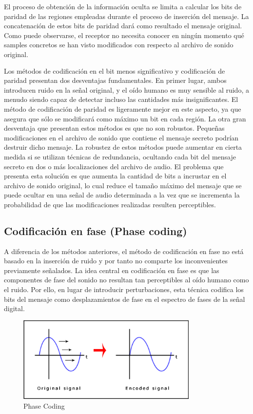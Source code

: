 \documentclass[12pt]{article}
\begin{document}
El proceso de obtención de la información oculta se limita a calcular los bits de paridad de las regiones empleadas durante el proceso de inserción del mensaje. La concatenación de estos bits de paridad dará como resultado el mensaje original. Como puede observarse, el receptor no necesita conocer en ningún momento qué samples concretos se han visto modificados con respecto al archivo de sonido original.

\bigskip

Los métodos de codificación en el bit menos significativo y codificación de paridad presentan dos desventajas fundamentales. En primer lugar, ambos introducen ruido en la señal original, y el oído humano es muy sensible al ruido, a menudo siendo capaz de detectar incluso las cantidades más insignificantes. El método de codificación de paridad es ligeramente mejor en este aspecto, ya que asegura que sólo se modificará como máximo un bit en cada región. La otra gran desventaja que presentan estos métodos es que no son robustos. Pequeñas modificaciones en el archivo de sonido que contiene el mensaje secreto podrían destruir dicho mensaje. La robustez de estos métodos puede aumentar en cierta medida si se utilizan técnicas de redundancia, ocultando cada bit del mensaje secreto en dos o más localizaciones del archivo de audio. El problema que presenta esta solución es que aumenta la cantidad de bits a incrustar en el archivo de sonido original, lo cual reduce el tamaño máximo del mensaje que se puede ocultar en una señal de audio determinada a la vez que se incrementa la probabilidad de que las modificaciones realizadas resulten perceptibles.

\subsection{Codificación en fase (Phase coding)}

A diferencia de los métodos anteriores, el método de codificación en fase no está basado en la inserción de ruido y por tanto no comparte los inconvenientes previamente señalados. La idea central en codificación en fase es que las componentes de fase del sonido no resultan tan perceptibles al oído humano como el ruido. Por ello, en lugar de introducir perturbaciones, esta técnica codifica los bits del mensaje como desplazamientos de fase en el espectro de fases de la señal digital.

\begin{figure}
  \centering
    \includegraphics[width=0.8\textwidth]{img/phaseshift}
  \caption{Phase Coding}
  \label{phasecoding}
\end{figure}
\end{document}
